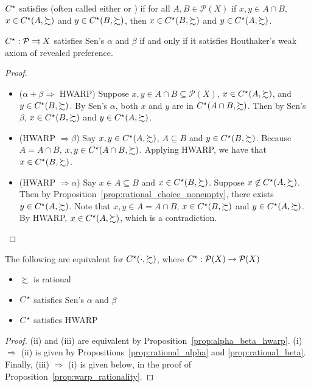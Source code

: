 \documentclass[12pt]{article}
\begin{document}
\begin{definition}
	$C^\star$ satisfies  (often called either  or ) if for all $A,B \in \mathcal{P}(X)$ if $x,y \in A \cap B$, $x \in C^\star(A,\succsim)$ and $y \in C^\star(B,\succsim)$, then $x \in C^\star(B,\succsim)$ and $y \in C^\star(A,\succsim)$.
\end{definition}

\begin{proposition}\label{prop:alpha_beta_hwarp}
	$C^\star : \mathcal{P} \rightrightarrows X$ satisfies Sen's $\alpha$ and $\beta$ if and only if it satisfies Houthaker's weak axiom of revealed preference.
\end{proposition}
\begin{proof}
	
	\begin{itemize}
		\item[(i)] ($\alpha + \beta \Longrightarrow $ HWARP) Suppose $x,y \in A \cap B \subseteq \mathcal{P}(X)$, $x \in C^\star(A,\succsim)$, and $y \in C^\star(B,\succsim)$. By Sen's $\alpha$, both $x$ and $y$ are in $C^\star(A \cap B,\succsim)$. Then by Sen's $\beta$, $x \in C^\star(B,\succsim)$ and $y \in C^\star(A,\succsim)$.
		
		\item[(ii)] (HWARP $\Longrightarrow \beta$) Say $x,y \in C^\star(A,\succsim)$, $A \subseteq B$ and $y \in C^\star(B,\succsim)$. Because $A = A \cap B$, $x,y \in C^\star(A \cap B,\succsim)$. Applying HWARP, we have that $x \in C^\star(B,\succsim)$.
		
		\item[(iii)] (HWARP $\Longrightarrow \alpha$) Say $x \in A \subseteq B$ and $x \in C^\star(B,\succsim)$. Suppose $x \not\in C^\star(A,\succsim)$. Then by Proposition~\ref{prop:rational_choice_nonempty}, there exists $y \in C^\star(A,\succsim)$. Note that $x,y \in A = A \cap B$, $x \in C^\star(B,\succsim)$ and $y \in C^\star(A,\succsim)$. By HWARP, $x \in C^\star(A,\succsim)$, which is a contradiction.
	\end{itemize}
\end{proof}

\begin{proposition}\label{prop:hwarp_alpha_beta_equiv}
	The following are equivalent for $C^\star(\cdot,\succsim)$, where $C^\star: \mathcal{P}(X) \to \mathcal{P}(X)$
	\begin{itemize}
		\item[(i)] $\succsim$ is rational
		\item[(ii)] $C^\star$ satisfies Sen's $\alpha$ and $\beta$
		\item[(iii)] $C^\star$ satisfies HWARP
	\end{itemize}
\end{proposition}
\begin{proof}
	(ii) and (iii) are equivalent by Proposition~\ref{prop:alpha_beta_hwarp}. (i) $\Longrightarrow$ (ii) is given by Propositions~\ref{prop:rational_alpha} and \ref{prop:rational_beta}. Finally, (iii) $\Longrightarrow$ (i) is given below, in the proof of Proposition~\ref{prop:warp_rationality}.
\end{proof}
\end{document}
